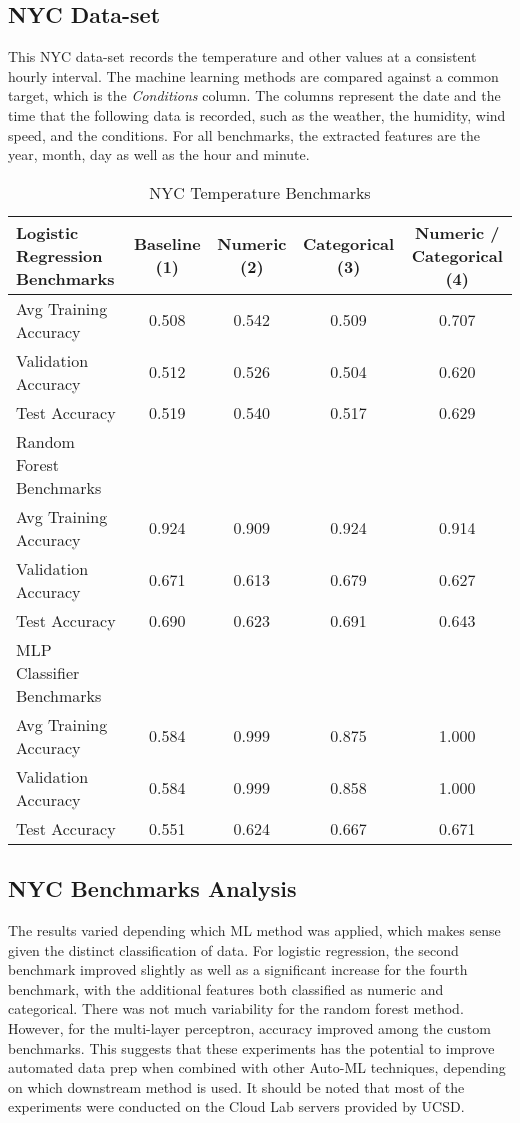 \documentclass{article}
\begin{document}
\subsection{NYC Data-set}
This NYC data-set records the temperature and other values at a consistent hourly interval. The machine learning methods are compared against a common target, which is the \textit{Conditions} column. The columns represent the date and the time that the following data is recorded, such as the weather, the humidity, wind speed, and the conditions. For all benchmarks, the extracted features are the year, month, day as well as the hour and minute. 

\def\arraystretch{1}
\begin{table}[ht]
\caption{NYC Temperature Benchmarks}
\centering
    \begin{tabular}{lcccc}
    \toprule
    Logistic Regression Benchmarks & Baseline (1) & Numeric (2) & Categorical (3) & Numeric / Categorical (4) \\
    \midrule
    Avg Training Accuracy & 0.508 & 0.542 & 0.509 & 0.707 \\
    Validation Accuracy & 0.512 & 0.526 & 0.504 & 0.620 \\
    Test Accuracy & 0.519 & 0.540 & 0.517 & 0.629 \\
    \midrule
    Random Forest Benchmarks & & & & \\
    \midrule
    Avg Training Accuracy & 0.924 & 0.909 & 0.924 & 0.914 \\
    Validation Accuracy & 0.671 & 0.613 & 0.679 & 0.627 \\
    Test Accuracy & 0.690 & 0.623 & 0.691 & 0.643 \\
    \midrule
    MLP Classifier Benchmarks & & & & \\
    \midrule
    Avg Training Accuracy & 0.584 & 0.999 & 0.875 & 1.000 \\
    Validation Accuracy & 0.584 & 0.999 & 0.858 & 1.000 \\
    Test Accuracy & 0.551 & 0.624 & 0.667 & 0.671 \\ 
    \bottomrule
    \end{tabular}
\end{table}

\subsection{NYC Benchmarks Analysis}
The results varied depending which ML method was applied, which makes sense given the distinct classification of data. For logistic regression, the second benchmark improved slightly as well as a significant increase for the fourth benchmark, with the additional features both classified as numeric and categorical. There was not much variability for the random forest method. However, for the multi-layer perceptron, accuracy improved among the custom benchmarks. This suggests that these experiments has the potential to improve automated data prep when combined with other Auto-ML techniques, depending on which downstream method is used. It should be noted that most of the experiments were conducted on the Cloud Lab servers provided by UCSD. \cite{Duplyakin+:ATC19}
\end{document}
